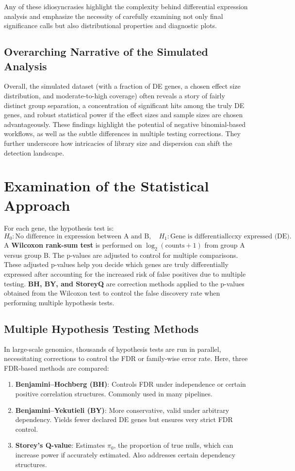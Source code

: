 \documentclass[12pt]{article}
\begin{document}
Any of these idiosyncrasies highlight the complexity behind differential expression analysis and emphasize the necessity of carefully examining not only final significance calls but also distributional properties and diagnostic plots.

\subsection{Overarching Narrative of the Simulated Analysis}
Overall, the simulated dataset (with a fraction of DE genes, a chosen effect size distribution, and moderate-to-high coverage) often reveals a story of fairly distinct group separation, a concentration of significant hits among the truly DE genes, and robust statistical power if the effect sizes and sample sizes are chosen advantageously. These findings highlight the potential of negative binomial-based workflows, as well as the subtle differences in multiple testing corrections. They further underscore how intricacies of library size and dispersion can shift the detection landscape.

\section{Examination of the Statistical Approach}

For each gene, the hypothesis test is:
\[
  H_0: \text{No difference in expression between A and B}, \quad
  H_1: \text{Gene is differentiallccxy expressed (DE)}.
\]
A \textbf{Wilcoxon rank-sum test} is performed on $\log_2(\text{counts}+1)$ from group A versus group B. The p-values are adjusted to control for multiple comparisons. These adjusted p-values help you decide which genes are truly differentially expressed after accounting for the increased risk of false positives due to multiple testing. \textbf{BH, BY, and StoreyQ} are correction methods applied to the p-values obtained from the Wilcoxon test to control the false discovery rate when performing multiple hypothesis tests.


\subsection{Multiple Hypothesis Testing Methods}

In large-scale genomics, thousands of hypothesis tests are run in parallel, necessitating corrections to control the FDR or family-wise error rate. Here, three FDR-based methods are compared:

\begin{enumerate}
    \item \textbf{Benjamini--Hochberg (BH)}: Controls FDR under independence or certain positive correlation structures. Commonly used in many pipelines.
    \item \textbf{Benjamini--Yekutieli (BY)}: More conservative, valid under arbitrary dependency. Yields fewer declared DE genes but ensures very strict FDR control.
    \item \textbf{Storey's Q-value}: Estimates $\pi_0$, the proportion of true nulls, which can increase power if accurately estimated. Also addresses certain dependency structures.
\end{enumerate}
\end{document}
